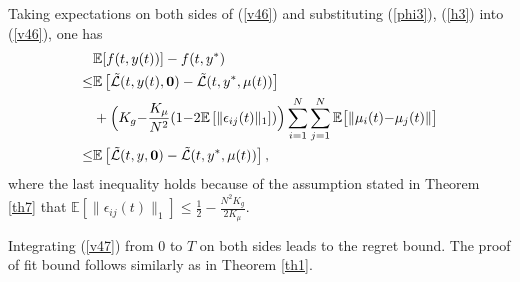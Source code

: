 \documentclass[final,5p,times,twocolumn,authoryear]{elsarticle}
\begin{document}
	Taking expectations on both sides of (\ref{v46}) and substituting (\ref{phi3}), (\ref{h3}) into (\ref{v46}), one has
	\begin{align}
		&\mathbb{E}[f(t,y(t))]-f(t,y^*)\notag\\
		\le
		&\mathbb{E}\left[\mathcal{\tilde{L}}(t,y(t),\boldsymbol{0}) - \mathcal{\tilde{L}}(t,y^*,\mu(t))\right]\notag\\
		&+\Big(K_g{-}\frac{K_\mu}{N^2}(1{-}2\mathbb{E}\left[\|\epsilon_{ij}(t)\|_1\right])\Big)\sum_{i=1}^{N} \sum_{j=1}^{N} \mathbb{E}\big[\|\mu_i(t){-}\mu_j(t)\|\big]\notag\\
		\le
		&\mathbb{E}\left[\mathcal{\tilde{L}}(t,y,\boldsymbol{0}) - \mathcal{\tilde{L}}(t,y^*,\mu(t))\right],\label{v47}
	\end{align}
	where the last inequality holds because of the assumption stated in Theorem \ref{th7} that $\mathbb{E}\left[\|\epsilon_{ij}(t)\|_1\right]\le \frac{1}{2}-\frac{N^2K_g}{2K_\mu}$.
	
	
	Integrating (\ref{v47}) from $0$ to $T$ on both sides leads to the regret bound. The proof of fit bound follows similarly as in Theorem \ref{th1}. 
	



%
%
\end{document}
